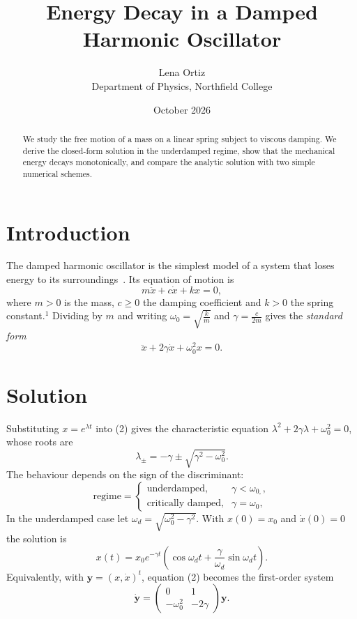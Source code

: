 \documentclass[11pt,a4paper]{article}
\title{Energy Decay in a Damped Harmonic Oscillator}
\author{Lena Ortiz\\ \small Department of Physics, Northfield College}
\date{October 2026}
\begin{document}
\maketitle

\begin{abstract}
We study the free motion of a mass on a linear spring subject to viscous damping. We derive the closed-form solution in the underdamped regime, show that the mechanical energy decays monotonically, and compare the analytic solution with two simple numerical schemes.
\end{abstract}

\section{Introduction}\label{sec:intro}

The damped harmonic oscillator is the simplest model of a system that loses energy to its surroundings~\cite{ref1}. Its equation of motion is
\begin{equation}
  m\ddot{x}+c\dot{x}+kx=0,
\end{equation}
where $m>0$ is the mass, $c\geq0$ the damping coefficient and $k>0$ the spring constant.$^{1}$ Dividing by $m$ and writing $\omega_{0}=\sqrt{\frac{k}{m}}$ and $\gamma=\frac{c}{2m}$ gives the \emph{standard form}
\begin{equation}
  \ddot{x}+2\gamma\dot{x}+\omega_{0}^{2}x=0.
\end{equation}

\section{Solution}

Substituting $x=e^{\lambda t}$ into (2) gives the characteristic equation $\lambda^{2}+2\gamma\lambda+\omega_{0}^{2}=0$, whose roots are
\begin{equation}
  \lambda_{\pm}=-\gamma\pm\sqrt{\gamma^{2}-\omega_{0}^{2}}.
  \label{eq:gauss}
\end{equation}
The behaviour depends on the sign of the discriminant:
\begin{equation*}
  \text{regime}=\begin{cases}
\text{underdamped,} & \gamma<\omega_{0,}, \\
\text{critically damped,} & \gamma=\omega_{0},
\end{cases}
\end{equation*}
In the underdamped case let $\omega_{d}=\sqrt{\omega_{0}^{2}-\gamma^{2}}$. With $x(0)=x_{0}$ and $\dot{x}(0)=0$ the solution is
\begin{equation}
  x(t)=x_{0}e^{-\gamma t}\left( \cos\omega_{d}t+\frac{\gamma}{\omega_{d}}\sin\omega_{d}t \right).
\end{equation}
Equivalently, with $\boldsymbol{y}=(x,\dot{x})^{t}$, equation (2) becomes the first-order system
\begin{equation}
  \dot{\boldsymbol{y}}=\begin{pmatrix}
0 & 1 \\
-\omega_{0}^{2} & -2\gamma
\end{pmatrix}\boldsymbol{y}.
\end{equation}
\end{document}
